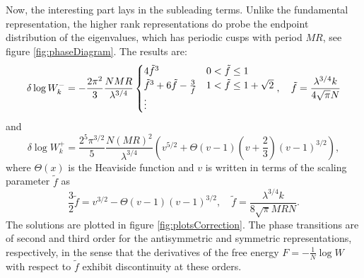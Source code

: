Now, the interesting part lays in the subleading terms. 
Unlike the fundamental representation, the higher rank representations do probe the endpoint distribution of the eigenvalues, 
which has periodic cusps with period $MR$, see figure \ref{fig:phaseDiagram}.
The results are:
\begin{equation}\label{WantisymPW}
 \delta \log W_{k}^- = -\dfrac{2\pi^2}{3} \dfrac{N M R}{\lambda^{3/4}}
\begin{cases}
 4\tilde{f}^3 & {\rm }0<\tilde{f}\leq 1
\\
 \tilde{f}^3+6\tilde{f}-\frac{3}{\tilde{f}} & {\rm } 1<\tilde{f}\leq 1+\sqrt{2}
 \\
 \vdots &
\end{cases}, \quad 
\tilde{f} = \dfrac{\lambda^{3/4} k }{ 4\sqrt{\pi} N}
\end{equation}
and
\begin{equation}\label{WsymPW}
 \delta \log W_{k}^+ = \dfrac{2^5\pi^{3/2}}{5}\dfrac{N (M R)^2}{\lambda^{3/4}} \left(v^{5/2}+\Theta(v-1)\left(v+\dfrac{2}{3}\right)(v-1)^{3/2}\right), 
\end{equation}
where $\Theta(x)$ is the Heaviside function and $v$ is written in terms of the scaling parameter $\tilde{f}$ as
\begin{equation}
  \dfrac{3}{2}\tilde{f} = v^{3/2}-\Theta(v-1)(v-1)^{3/2}, \quad \tilde{f} = \dfrac{\lambda^{3/4} k}{8\sqrt{\pi} M R N}.
\end{equation}
The solutions are plotted in figure \ref{fig:plotsCorrection}.
The phase transitions are of second and third order for the antisymmetric and symmetric representations, respectively,
in the sense that the derivatives of the free energy $F=-\frac{1}{N}\log W$ with respect to $\tilde{f}$ exhibit discontinuity at these orders.


